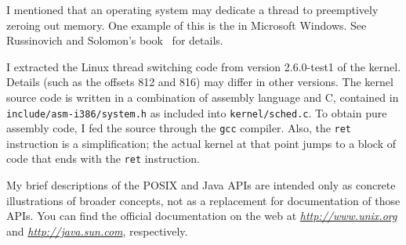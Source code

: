 I mentioned that an operating system may dedicate a thread to
preemptively zeroing out memory.  One example of this is the  in Microsoft Windows.  See
Russinovich and Solomon's
book~\cite{max981} for details.

I extracted the Linux thread switching code from version 2.6.0-test1
of the kernel.  Details (such as the offsets 812 and 816) may differ
in other versions.  The kernel source code is written in a combination
of assembly language and C, contained in
\verb|include/asm-i386/system.h| as included into
\verb|kernel/sched.c|.  To obtain pure assembly code, I fed the
source through the \verb|gcc| compiler.  Also, the \verb|ret|
instruction is a simplification; the actual kernel at that point jumps
to a block of code that ends with the \verb|ret| instruction.

My brief descriptions of the POSIX and Java APIs are intended only as
concrete illustrations of broader concepts, not as a replacement for
documentation of those APIs.  You can find the official documentation
on the web at \textit{\url{http://www.unix.org}} and \textit{\url{http://java.sun.com}},
respectively.
